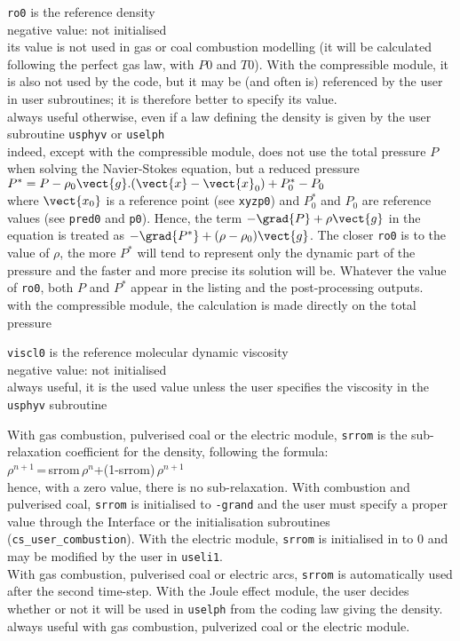 {{\tt ro0} is the reference density\\
negative value: not initialised\\
its value is not used in gas or coal combustion modelling (it
will be calculated following the perfect gas law, with $P0$ and $T0$). With the
compressible module, it is also not used by the code, but it may be (and often
is) referenced by the user in user subroutines; it is therefore better to
specify its value.\\
always useful otherwise, even if a law defining the density is given by
the user subroutine \texttt{usphyv} or \texttt{uselph}\\
indeed, except with the
compressible module, \CS does not
use the total pressure $P$ when solving the Navier-Stokes equation, but a
reduced pressure \\
$P^*=P-\rho_0\vect{g}.(\vect{x}-\vect{x}_0)+P^*_0-P_0$\\
where
$\vect{x_0}$ is a reference point (see {\tt xyzp0}) and $P^*_0$ and $P_0$ are
reference values (see {\tt pred0} and {\tt p0}). Hence, the term
$-\grad{P}+\rho\vect{g}$ in the equation is treated as
$-\grad{P^*}+(\rho-\rho_0)\vect{g}$. The closer {\tt ro0} is to the value of $\rho$,
the more $P^*$ will tend to represent only the dynamic part of the pressure and
the faster and more precise its solution will be. Whatever the value of {\tt ro0},
both $P$ and $P^*$ appear in the listing and the post-processing outputs.\\
with the compressible module, the calculation is made directly on the total
pressure}

{ {\tt viscl0} is the reference molecular dynamic
viscosity\\
negative value: not initialised\\
always useful, it is the used value unless the user specifies the
viscosity in the \texttt{usphyv}} subroutine

{With gas combustion, pulverised coal or the electric module, {\tt srrom}
 is the sub-relaxation coefficient for the density, following the formula:\\
$\rho^{n+1}$\,=\,srrom\,$\rho^n$+(1-srrom)\,$\rho^{n+1}$\\
hence, with a zero value, there is no sub-relaxation.
With combustion and pulverised coal, {\tt srrom} is initialised to {\tt -grand}
and the user must specify a proper value through the Interface or the
initialisation subroutines (\texttt{cs\_user\_combustion}). With the electric module, {\tt srrom} is initialised in to 0
and may be modified by the user in \texttt{useli1}.\\
With gas combustion, pulverised coal or electric arcs, {\tt srrom} is
automatically used after the second time-step. With the Joule effect module,
the user decides whether or not it will be used in \texttt{uselph}
from the coding law giving the density.}\\
always useful with gas combustion, pulverized coal or the electric module.

